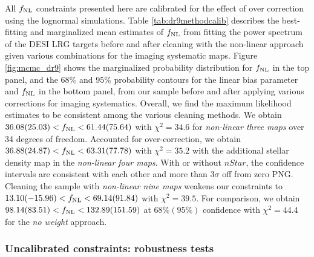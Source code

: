 All $f_{\rm NL}$ constraints presented here are calibrated for the effect of over correction using the lognormal simulations. Table \ref{tab:dr9methodcalib} describes the best-fitting and marginalized mean estimates of $f_{\rm NL}$ from fitting the power spectrum of the DESI LRG targets before and after cleaning with the non-linear approach given various combinations for the imaging systematic maps. Figure \ref{fig:mcmc_dr9} shows the marginalized probability distribution for $f_{\rm NL}$ in the top panel, and the $68\%$ and $95\%$ probability contours for the linear bias parameter and $f_{\rm NL}$ in the bottom panel, from our sample before and after applying various corrections for imaging systematics. Overall, we find the maximum likelihood estimates to be consistent among the various cleaning methods. We obtain $36.08 (25.03) < f_{\rm NL} < 61.44(75.64)$ with $\chi^{2}=34.6$ for \textit{non-linear three maps} over 34 degrees of freedom. Accounted for over-correction, we obtain $36.88(24.87) < f_{\rm NL} < 63.31(77.78)$ with $\chi^{2}=35.2$ with the additional stellar density map in the \textit{non-linear four maps}. With or without $nStar$, the confidence intervals are consistent with each other and more than $3\sigma$ off from zero PNG. Cleaning the sample with \textit{non-linear nine maps} weakens our constraints to $13.10(-15.96) < f_{\rm NL} < 69.14(91.84)$ with $\chi^{2}=39.5$. For comparison, we obtain $98.14(83.51) < f_{\rm NL} < 132.89(151.59)$ at $68\% (95\%)$ confidence with $\chi^{2}=44.4$ for the \textit{no weight} approach.

\subsubsection{Uncalibrated constraints: robustness tests}


